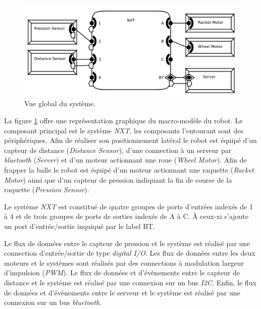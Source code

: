       \begin{figure}[!ht]
        \centering 
        \includegraphics[scale=0.25]{./img/aadl-robot1.pdf}
        \caption{Vue global du système.}
        \label{fig:aadl-robot1}
      \end{figure}
        
      La figure \ref{fig:aadl-robot1} offre une représentation
      graphique du macro-modèle du robot. Le composant principal est
      le système {\it NXT}, les composants l'entourant sont des
      périphériques. Afin de réaliser son positionnement latéral le
      robot est équipé d'un capteur de distance ({\it Distance
        Sensor}), d'une connection à un serveur par {\it bluetooth}
      ({\it Server}) et d'un moteur actionnant une roue ({\it Wheel
        Motor}). Afin de frapper la balle le robot est équipé d'un
      moteur actionnant une raquette ({\it Racket Motor}) ainsi que
      d'un capteur de pression indiquant la fin de course de la
      raquette ({\it Pression Sensor}).

      Le système {\it NXT} est constitué de quatre groupes de ports
      d'entrées indexés de 1 à 4 et de trois groupes de ports de
      sorties indexés de A à C. À ceux-xi s'ajoute un port
      d'entrée/sortie inquiqué par le label BT.

      Le flux de données entre le capteur de pression et le système
      est réalisé par une connection d'entrée/sortie de type {\it digital I/O}.
      Les flux de données entre les deux moteurs et le systèmes sont
      réalisés par des connections à modulation largeur d'impulsion
      ({\it PWM}). Le flux de données et d'évènements entre le capteur
      de distance et le système est réalisé par une connexion sur
      un bus {\it I2C}. Enfin, le flux de données et d'évènements entre le
      serveur et le système est réalisé par une connexion sur un bus {\it
        bluetooth}.

      ~

